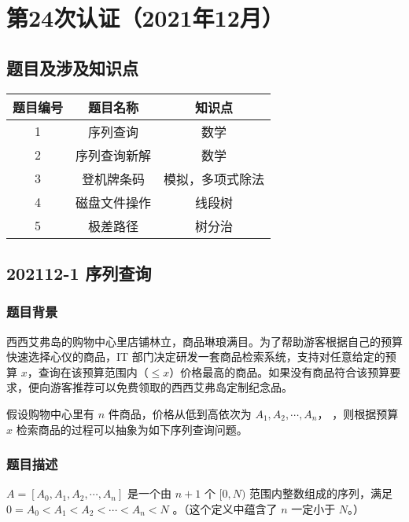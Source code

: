 \documentclass[cn,10pt,math=newtx,citestyle=gb7714-2015,bibstyle=gb7714-2015]{elegantbook}
\begin{document}
\chapter{第24次认证（2021年12月）}

\section{题目及涉及知识点}

\begin{table}[htbp]
  \centering
  \begin{tabular}{ccc}
    \toprule
    题目编号 & 题目名称 & 知识点\\
    \midrule
    1 & 序列查询 & 数学\\
    2 & 序列查询新解 & 数学\\
    3 & 登机牌条码 & 模拟，多项式除法\\
    4 & 磁盘文件操作 & 线段树\\
    5 & 极差路径 & 树分治\\
    \bottomrule
  \end{tabular}
\end{table}

\newpage

\section{202112-1	序列查询}

\subsection*{题目背景}

西西艾弗岛的购物中心里店铺林立，商品琳琅满目。为了帮助游客根据自己的预算快速选择心仪的商品，IT 部门决定研发一套商品检索系统，支持对任意给定的预算 $x$，查询在该预算范围内（$\le x$）价格最高的商品。如果没有商品符合该预算要求，便向游客推荐可以免费领取的西西艾弗岛定制纪念品。

假设购物中心里有 $n$ 件商品，价格从低到高依次为 $A_1,A_2,\cdots, A_n$，
，则根据预算 $x$ 检索商品的过程可以抽象为如下序列查询问题。

\subsection*{题目描述}

$A=[A_0,A_1,A_2,\cdots,A_n]$ 是一个由 $n+1$ 个 $[0,N)$ 范围内整数组成的序列，满足 $0=A_0<A_1<A_2<\cdots<A_n<N$
。（这个定义中蕴含了 $n$ 一定小于 $N$。）
\end{document}
